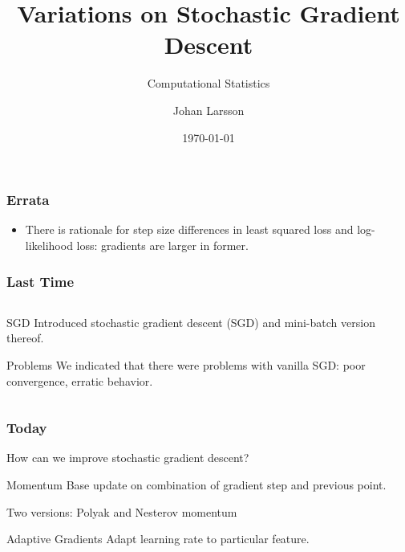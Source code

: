 \documentclass[aspectratio=1610,onlytextwidth]{beamer}
\date{\today}
\title{Variations on Stochastic Gradient Descent}
\subtitle{Computational Statistics}
\author{Johan Larsson}
\institute{Department of Mathematical Sciences, University of Copenhagen}
\begin{document}
\maketitle

%
%
\begin{frame}[c]
  \frametitle{Errata}
  \begin{itemize}
    \item There is rationale for step size differences in least squared loss and
          log-likelihood loss: gradients are larger in former.
  \end{itemize}
\end{frame}

\begin{frame}[c]
  \frametitle{Last Time}

  \begin{columns}[T]
    \begin{column}{0.39\textwidth}
      \begin{block}{SGD}
        Introduced stochastic gradient descent (SGD) and mini-batch version thereof.
      \end{block}
      \pause
      \begin{block}{Problems}
        We indicated that there were problems with vanilla SGD: poor convergence,
        erratic behavior.
      \end{block}
    \end{column}
    \begin{column}{0.51\textwidth}
      \begin{algorithm}[H]
        \caption{Mini-Batch SGD}
      \end{algorithm}
    \end{column}
  \end{columns}

\end{frame}

\begin{frame}[c]
  \frametitle{Today}

  How can we improve stochastic gradient descent?

  \begin{block}{Momentum}
    Base update on combination of gradient step and previous point.

    \medskip

    Two versions: Polyak and Nesterov momentum
  \end{block}

  \pause

  \begin{block}{Adaptive Gradients}
    Adapt learning rate to particular feature.
  \end{block}

\end{frame}
\end{document}
